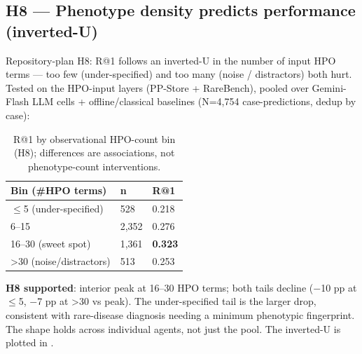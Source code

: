 \subsection{H8 --- Phenotype density predicts performance (inverted-U)}\label{sec-7-1-2}

Repository-plan H8: R@1 follows an inverted-U in the number of input HPO terms ---
too few (under-specified) and too many (noise / distractors) both hurt. Tested
on the HPO-input layers (PP-Store + RareBench), pooled over Gemini-Flash LLM
cells + offline/classical baselines (N=4,754 case-predictions, dedup by case):

\begin{table}[t]
\centering\scriptsize\setlength{\tabcolsep}{3.5pt}
\caption{R@1 by observational HPO-count bin (H8); differences are associations, not phenotype-count interventions.}\label{tbl:cascade}
\begin{tabular}{@{}
lll@{}}
\toprule
Bin (\#HPO terms) & n & R@1 \\
\midrule
\ensuremath{\leq}5 (under-specified) & 528 & 0.218 \\
6--15 & 2,352 & 0.276 \\
16--30 (sweet spot) & 1,361 & \textbf{0.323} \\
\textgreater30 (noise/distractors) & 513 & 0.253 \\
\bottomrule
\end{tabular}
\end{table}

\textbf{H8 supported}: interior peak at 16--30 HPO terms; both tails decline
(\ensuremath{-}10 pp at \ensuremath{\leq}5, \ensuremath{-}7 pp at \textgreater30 vs peak). The under-specified tail is the larger
drop, consistent with rare-disease diagnosis needing a minimum phenotypic
fingerprint. The shape holds across individual agents, not just the pool.
The inverted-U is plotted in .

